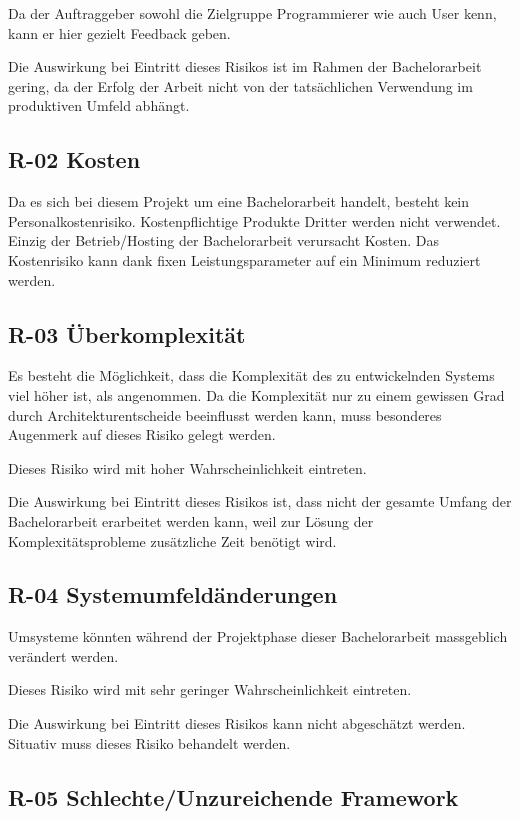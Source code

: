 Da der Auftraggeber sowohl die Zielgruppe Programmierer wie auch User
kenn, kann er hier gezielt Feedback geben.

Die Auswirkung bei Eintritt dieses Risikos ist im Rahmen der
Bachelorarbeit gering, da der Erfolg der Arbeit nicht von der
tatsächlichen Verwendung im produktiven Umfeld abhängt.

\subsection{R-02 Kosten}\label{r-02-kosten}

Da es sich bei diesem Projekt um eine Bachelorarbeit handelt, besteht
kein Personalkostenrisiko. Kostenpflichtige Produkte Dritter werden
nicht verwendet. Einzig der Betrieb/Hosting der Bachelorarbeit
verursacht Kosten. Das Kostenrisiko kann dank fixen Leistungsparameter
auf ein Minimum reduziert werden.

\subsection{R-03 Überkomplexität}\label{r-03-uxfcberkomplexituxe4t}

Es besteht die Möglichkeit, dass die Komplexität des zu entwickelnden
Systems viel höher ist, als angenommen. Da die Komplexität nur zu einem
gewissen Grad durch Architekturentscheide beeinflusst werden kann, muss
besonderes Augenmerk auf dieses Risiko gelegt werden.

Dieses Risiko wird mit hoher Wahrscheinlichkeit eintreten.

Die Auswirkung bei Eintritt dieses Risikos ist, dass nicht der gesamte
Umfang der Bachelorarbeit erarbeitet werden kann, weil zur Lösung der
Komplexitätsprobleme zusätzliche Zeit benötigt wird.

\subsection{R-04
Systemumfeldänderungen}\label{r-04-systemumfelduxe4nderungen}

Umsysteme könnten während der Projektphase dieser Bachelorarbeit
massgeblich verändert werden.

Dieses Risiko wird mit sehr geringer Wahrscheinlichkeit eintreten.

Die Auswirkung bei Eintritt dieses Risikos kann nicht abgeschätzt
werden. Situativ muss dieses Risiko behandelt werden.

\subsection{R-05 Schlechte/Unzureichende
Framework}\label{r-05-schlechteunzureichende-framework}

